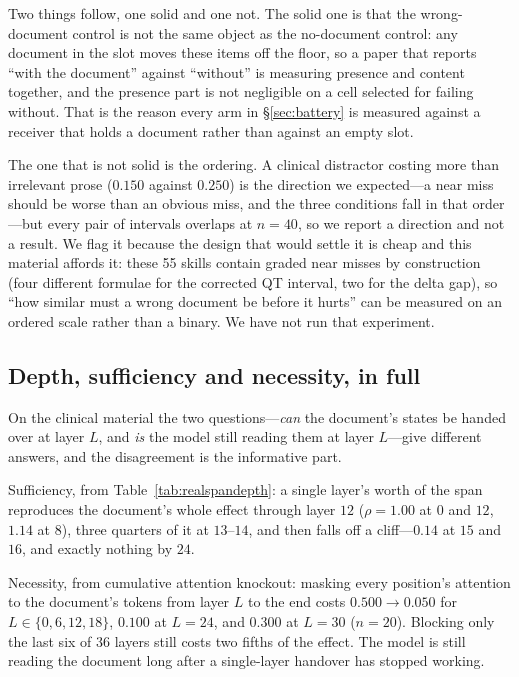 \documentclass{article}
\begin{document}
Two things follow, one solid and one not. The solid one is that the
wrong-document control is not the same object as the no-document control: any
document in the slot moves these items off the floor, so a paper that reports
``with the document'' against ``without'' is measuring presence and content
together, and the presence part is not negligible on a cell selected for failing
without. That is the reason every arm in \S\ref{sec:battery} is measured against
a receiver that holds a document rather than against an empty slot.

The one that is not solid is the ordering. A clinical distractor costing more
than irrelevant prose ($0.150$ against $0.250$) is the direction we expected---a
near miss should be worse than an obvious miss, and the three conditions fall in
that order---but every pair of intervals overlaps at $n=40$, so we report a
direction and not a result. We flag it because the design that would settle it is cheap and
this material affords it: these 55 skills contain graded near misses by
construction (four different formulae for the corrected QT interval, two for the
delta gap), so ``how similar must a wrong document be before it hurts'' can be
measured on an ordered scale rather than a binary. We have not run that
experiment.




\subsection{Depth, sufficiency and necessity, in full}
\label{app:depth}

On the clinical material the two questions---\emph{can} the document's states be
handed over at layer $L$, and \emph{is} the model still reading them at layer
$L$---give different answers, and the disagreement is the informative part.

Sufficiency, from Table~\ref{tab:realspandepth}: a single layer's worth of the
span reproduces the document's whole effect through layer $12$ ($\rho = 1.00$ at
$0$ and $12$, $1.14$ at $8$), three quarters of it at $13$--$14$, and then falls
off a cliff---$0.14$ at $15$ and $16$, and exactly nothing by $24$.

Necessity, from cumulative attention knockout: masking every position's
attention to the document's tokens from layer $L$ to the end costs
$0.500 \to 0.050$ for $L \in \{0, 6, 12, 18\}$, $0.100$ at $L=24$, and
$\mathbf{0.300}$ at $L=30$ ($n=20$). Blocking only the last six of $36$ layers
still costs two fifths of the effect. The model is still reading the document
long after a single-layer handover has stopped working.
\end{document}

